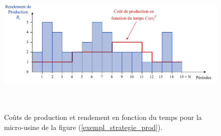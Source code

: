 \begin{figure}[H]
	\centerline{
		\includegraphics[height=7cm]{images_these/exempl_strategie_prod.pdf}}
	\caption[Coûts de production]{Coûts de production et rendement en fonction du temps pour la micro-usine de la figure (\ref{exempl_strategie_prod}). }
	\label{exempl_cout_prod}
\end{figure}

